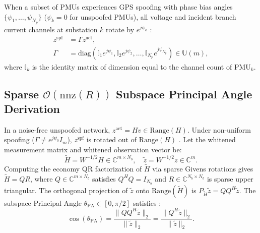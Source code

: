 \documentclass[journal,twoside]{IEEEtran}
\begin{document}
When a subset of PMUs experiences GPS spoofing with phase bias angles $\{\psi_1, \dots, \psi_{N_p}\}$ ($\psi_k = 0$ for unspoofed PMUs), all voltage and incident branch current channels at substation $k$ rotate by $e^{j\psi_k}$ \cite{jiang2013spoofing,raju2023mitigation}:
\begin{equation}
\begin{aligned}
z^{\mathrm{spf}} &= \Gamma z^{\mathrm{act}}, \\
\Gamma &= \mathrm{diag}\left(\mathbb{I}_1 e^{j\psi_1}, \mathbb{I}_2 e^{j\psi_2}, \dots, \mathbb{I}_{N_p} e^{j\psi_{N_p}}\right) \in \mathbb{U}(m),
\end{aligned}
\label{eq:spoof_model}
\end{equation}
where $\mathbb{I}_k$ is the identity matrix of dimension equal to the channel count of $\mathrm{PMU}_k$.

\subsection{Sparse $\mathcal{O}(\mathrm{nnz}(R))$ Subspace Principal Angle Derivation}
In a noise-free unspoofed network, $z^{\mathrm{act}} = H v \in \mathrm{Range}(H)$. Under non-uniform spoofing ($\Gamma \neq e^{j\psi_0}I_m$), $z^{\mathrm{spf}}$ is rotated out of $\mathrm{Range}(H)$ \cite{raju2023mitigation,golub1996matrix,badugu2026synchrophasor}. Let the whitened measurement matrix and whitened observation vector be:
\begin{equation}
\tilde{H} = W^{-1/2} H \in \mathbb{C}^{m \times N_b}, \quad \tilde{z} = W^{-1/2} z \in \mathbb{C}^m.
\label{eq:whitened}
\end{equation}
Computing the economy QR factorization of $\tilde{H}$ via sparse Givens rotations \cite{pandian1999towards,golub1996matrix} gives $\tilde{H} = Q R$, where $Q \in \mathbb{C}^{m \times N_b}$ satisfies $Q^H Q = I_{N_b}$ and $R \in \mathbb{C}^{N_b \times N_b}$ is sparse upper triangular. The orthogonal projection of $\tilde{z}$ onto $\mathrm{Range}(\tilde{H})$ is $P_{\tilde{H}}\tilde{z} = Q Q^H \tilde{z}$. The subspace Principal Angle $\theta_{\mathrm{PA}} \in [0, \pi/2]$ satisfies \cite{golub1996matrix}:
\begin{equation}
\cos(\theta_{\mathrm{PA}}) = \frac{\|Q Q^H \tilde{z}\|_2}{\|\tilde{z}\|_2} = \frac{\|Q^H \tilde{z}\|_2}{\|\tilde{z}\|_2}.
\label{eq:pa_def}
\end{equation}
\end{document}
